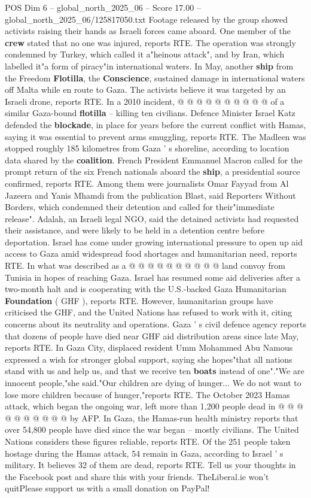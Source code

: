 \begin{textsample}{POS Dim 6 – global\_north\_2025\_06 – Score 17.00 – global\_north\_2025\_06/125817050.txt}
Footage released by the group showed activists raising their hands as Israeli forces came aboard.
One member of the \textbf{crew} stated that no one was injured, reports RTE.
The operation was strongly condemned by Turkey, which called it a"heinous attack", and by Iran, which labelled it"a form of piracy"in international waters.
In May, another \textbf{ship} from the Freedom \textbf{Flotilla}, the \textbf{Conscience}, sustained damage in international waters off Malta while en route to Gaza.
The activists believe it was targeted by an Israeli drone, reports RTE.
In a 2010 incident, @ @ @ @ @ @ @ @ @ @ of a similar Gaza-bound \textbf{flotilla} -- killing ten civilians.
Defence Minister Israel Katz defended the \textbf{blockade}, in place for years before the current conflict with Hamas, saying it was essential to prevent arms smuggling, reports RTE.
The Madleen was stopped roughly 185 kilometres from Gaza ' s shoreline, according to location data shared by the \textbf{coalition}.
French President Emmanuel Macron called for the prompt return of the six French nationals aboard the \textbf{ship}, a presidential source confirmed, reports RTE.
Among them were journalists Omar Fayyad from Al Jazeera and Yanis Mhamdi from the publication Blast, said Reporters Without Borders, which condemned their detention and called for their"immediate release".
Adalah, an Israeli legal NGO, said the detained activists had requested their assistance, and were likely to be held in a detention centre before deportation.
Israel has come under growing international pressure to open up aid access to Gaza amid widespread food shortages and humanitarian need, reports RTE.
In what was described as a @ @ @ @ @ @ @ @ @ @ land convoy from Tunisia in hopes of reaching Gaza.
Israel has resumed some aid deliveries after a two-month halt and is cooperating with the U.S.-backed Gaza Humanitarian \textbf{Foundation} ( GHF ), reports RTE.
However, humanitarian groups have criticised the GHF, and the United Nations has refused to work with it, citing concerns about its neutrality and operations.
Gaza ' s civil defence agency reports that dozens of people have died near GHF aid distribution areas since late May, reports RTE.
In Gaza City, displaced resident Umm Mohammed Abu Namous expressed a wish for stronger global support, saying she hopes"that all nations stand with us and help us, and that we receive ten \textbf{boats} instead of one"."We are innocent people,"she said."Our children are dying of hunger...
We do not want to lose more children because of hunger,"reports RTE.
The October 2023 Hamas attack, which began the ongoing war, left more than 1,200 people dead in @ @ @ @ @ @ @ @ @ @ by AFP.
In Gaza, the Hamas-run health ministry reports that over 54,800 people have died since the war began -- mostly civilians.
The United Nations considers these figures reliable, reports RTE.
Of the 251 people taken hostage during the Hamas attack, 54 remain in Gaza, according to Israel ' s military.
It believes 32 of them are dead, reports RTE.
Tell us your thoughts in the Facebook post and share this with your friends.
TheLiberal.ie won't quitPlease support us with a small donation on PayPal!


\end{textsample}
